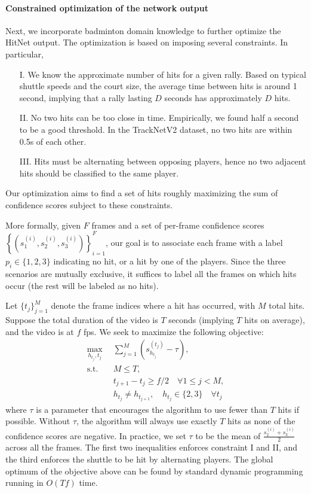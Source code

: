 \paragraph{Constrained optimization of the network output}
Next, we incorporate badminton domain knowledge to further optimize the HitNet output. The optimization is based on imposing several constraints. In particular,
\begin{itemize}[noitemsep]
\item[I.] We know the approximate number of hits for a given rally. Based on typical shuttle speeds and the court size, the average time between hits is around 1 second, implying that a rally lasting $D$ seconds has approximately $D$ hits.
\item[II.] No two hits can be too close in time. Empirically, we found half a second to be a good threshold. In the TrackNetV2 dataset, no two hits are within 0.5s of each other.
\item[III.] Hits must be alternating between opposing players, hence no two adjacent hits should be classified to the same player.
\end{itemize}
Our optimization aims to find a set of hits roughly maximizing the sum of confidence scores subject to these constraints.

More formally, given $F$ frames and a set of per-frame confidence scores $\left\{\left(s_1^{(i)}, s_2^{(i)}, s_3^{(i)}\right)\right\}_{i=1}^F$, our goal is to associate each frame with a label $p_i \in \{1, 2, 3\}$ indicating no hit, or a hit by one of the players. Since the three scenarios are mutually exclusive, it suffices to label all the frames on which hits occur (the rest will be labeled as no hits). 

Let $\{t_j\}_{j=1}^M$ denote the frame indices where a hit has occurred, with $M$ total hits. Suppose the total duration of the video is $T$ seconds (implying $T$ hits on average), and the video is at $f$ fps. We seek to maximize the following objective:
\begin{align*}
    \max_{h_{t_j}, t_j} & \sum_{j=1}^M \left( s_{h_{t_j}}^{(t_j)} - \tau \right), \\
    \text{s.t.}\quad & M \leq T, \\
         & t_{j+1} - t_j \geq f/2 \quad \forall 1\leq j<M, \\
         & h_{t_j} \neq h_{t_{j+1}}, \quad h_{t_j} \in \{2,3\} \quad \forall t_j
\end{align*}
where $\tau$ is a parameter that encourages the algorithm to use fewer than $T$ hits if possible. Without $\tau$, the algorithm will always use exactly $T$ hits as none of the confidence scores are negative. In practice, we set $\tau$ to be the mean of $\frac{s_2^{(i)}+s_3^{(i)}}{2}$ across all the frames. The first two inequalities enforces constraint I and II, and the third enforces the shuttle to be hit by alternating players. The global optimum of the objective above can be found by standard dynamic programming running in $O(Tf)$ time.


